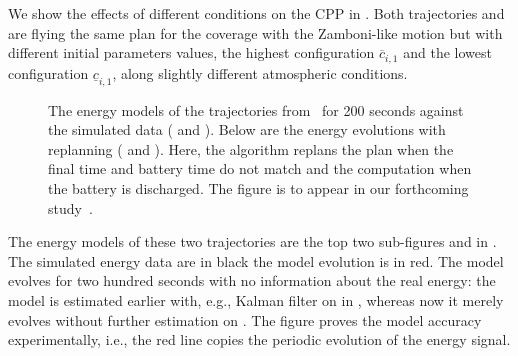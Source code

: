 We show the effects of different conditions on the CPP in . Both trajectories  and  are flying the same plan for the coverage with the Zamboni-like motion but with different initial parameters values, the highest configuration $\overline{c}_{i,1}$ and the lowest configuration $\underline{c}_{i,1}$, along slightly different atmospheric conditions. 
\begin{figure}[h!]
  \centering
  \selectfont
  \footnotesize    
  
  \caption[Numerical simulations with the energy models of different static and dynamic plans]{The energy models of the trajectories from~ for 200 seconds against the simulated data ( and ). Below are the energy evolutions with replanning ( and ). Here, the algorithm replans the plan when the final time and battery time do not match and the computation when the battery is discharged. The figure is to appear in our forthcoming study~\citep{seewald202Xenergy}.}
  \label{fig:ener-revised}
\end{figure}
The energy models of these two trajectories are the top two sub-figures  and  in . The simulated energy data are in black the model evolution is in red. The model evolves for two hundred seconds with no information about the real energy: the model is estimated earlier with, e.g., Kalman filter on  in , whereas now it merely evolves without further estimation on . The figure proves the model accuracy experimentally, i.e., the red line copies the periodic evolution of the energy signal.


